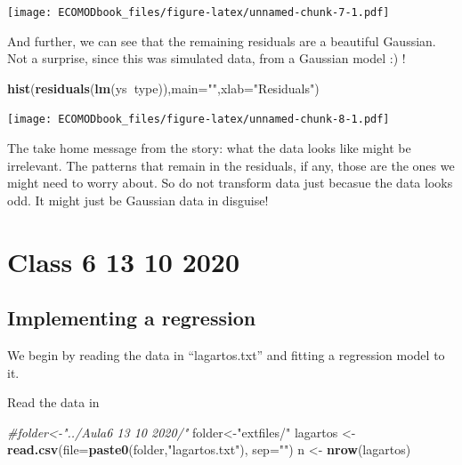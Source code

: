 \documentclass[
]{book}
\newenvironment{Shaded}{\begin{snugshade}}{\end{snugshade}}
\newcommand{\CommentTok}[1]{\textcolor[rgb]{0.56,0.35,0.01}{\textit{#1}}}
\newcommand{\DataTypeTok}[1]{\textcolor[rgb]{0.13,0.29,0.53}{#1}}
\newcommand{\KeywordTok}[1]{\textcolor[rgb]{0.13,0.29,0.53}{\textbf{#1}}}
\newcommand{\NormalTok}[1]{#1}
\newcommand{\OperatorTok}[1]{\textcolor[rgb]{0.81,0.36,0.00}{\textbf{#1}}}
\newcommand{\StringTok}[1]{\textcolor[rgb]{0.31,0.60,0.02}{#1}}
\begin{document}
\texttt{[image: ECOMODbook\_files/figure-latex/unnamed-chunk-7-1.pdf]}

And further, we can see that the remaining residuals are a beautiful Gaussian. Not a surprise, since this was simulated data, from a Gaussian model :) !

\begin{Shaded}
\begin{Highlighting}[]
\KeywordTok{hist}\NormalTok{(}\KeywordTok{residuals}\NormalTok{(}\KeywordTok{lm}\NormalTok{(ys}\OperatorTok{~}\NormalTok{type)),}\DataTypeTok{main=}\StringTok{""}\NormalTok{,}\DataTypeTok{xlab=}\StringTok{"Residuals"}\NormalTok{)}
\end{Highlighting}
\end{Shaded}

\texttt{[image: ECOMODbook\_files/figure-latex/unnamed-chunk-8-1.pdf]}

The take home message from the story: what the data looks like might be irrelevant. The patterns that remain in the residuals, if any, those are the ones we might need to worry about. So do not transform data just becasue the data looks odd. It might just be Gaussian data in disguise!

\hypertarget{aula6}{%
\chapter{Class 6 13 10 2020}\label{aula6}}

\hypertarget{implementing-a-regression}{%
\section{Implementing a regression}\label{implementing-a-regression}}

We begin by reading the data in ``lagartos.txt'' and fitting a regression model to it.

Read the data in

\begin{Shaded}
\begin{Highlighting}[]
\CommentTok{#folder<-"../Aula6 13 10 2020/"}
\NormalTok{folder<-}\StringTok{"extfiles/"}
\NormalTok{lagartos <-}\StringTok{ }\KeywordTok{read.csv}\NormalTok{(}\DataTypeTok{file=}\KeywordTok{paste0}\NormalTok{(folder,}\StringTok{"lagartos.txt"}\NormalTok{), }\DataTypeTok{sep=}\StringTok{""}\NormalTok{)}
\NormalTok{n <-}\StringTok{ }\KeywordTok{nrow}\NormalTok{(lagartos)}
\end{Highlighting}
\end{Shaded}
\end{document}
